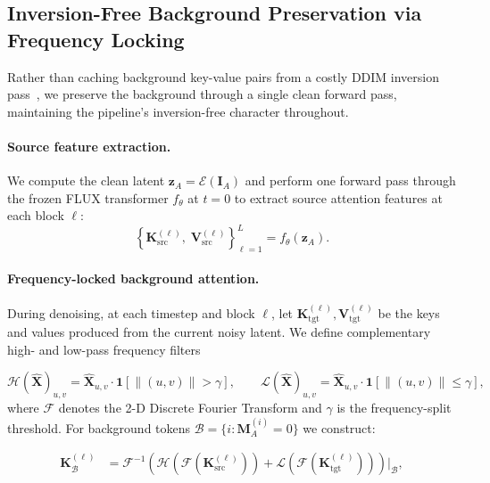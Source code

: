 \subsection{Inversion-Free Background Preservation via Frequency Locking}

Rather than caching background key-value pairs from a costly DDIM inversion
pass~\citep{Zhu2025KVEdit}, we preserve the background through a single clean forward pass,
maintaining the pipeline's inversion-free character throughout.

\paragraph{Source feature extraction.}
We compute the clean latent $\mathbf{z}_A = \mathcal{E}(\mathbf{I}_A)$ and perform one forward
pass through the frozen FLUX transformer $f_\theta$ at $t=0$ to extract source attention
features at each block $\ell$:
\begin{equation}
    \left\{\mathbf{K}_{\text{src}}^{(\ell)},\;
           \mathbf{V}_{\text{src}}^{(\ell)}\right\}_{\ell=1}^{L}
    = f_\theta(\mathbf{z}_A).
    \label{eq:src_features}
\end{equation}

\paragraph{Frequency-locked background attention.}
During denoising, at each timestep and block $\ell$, let
$\mathbf{K}_{\text{tgt}}^{(\ell)}, \mathbf{V}_{\text{tgt}}^{(\ell)}$
be the keys and values produced from the current noisy latent.
We define complementary high- and low-pass frequency filters

\begin{equation}
    \mathcal{H}(\hat{\mathbf{X}})_{u,v} =
        \hat{\mathbf{X}}_{u,v}\cdot\mathbf{1}\!\left[\|(u,v)\| > \gamma\right],
    \qquad
    \mathcal{L}(\hat{\mathbf{X}})_{u,v} =
        \hat{\mathbf{X}}_{u,v}\cdot\mathbf{1}\!\left[\|(u,v)\| \leq \gamma\right],
    \label{eq:filters}
\end{equation}
where $\mathcal{F}$ denotes the 2-D Discrete Fourier Transform and $\gamma$ is the
frequency-split threshold.
For background tokens $\mathcal{B} = \{i : \mathbf{M}_A^{(i)} = 0\}$ we construct:

\begin{equation}
\begin{aligned}
    \mathbf{K}_{\mathcal{B}}^{(\ell)}
        &= \mathcal{F}^{-1}\!\left(
              \mathcal{H}\!\left(\mathcal{F}\!\left(\mathbf{K}_{\text{src}}^{(\ell)}\right)\right)
            + \mathcal{L}\!\left(\mathcal{F}\!\left(\mathbf{K}_{\text{tgt}}^{(\ell)}\right)\right)
           \right)\!\bigg|_{\mathcal{B}},
\end{aligned}
\label{eq:bg_K}
\end{equation}

